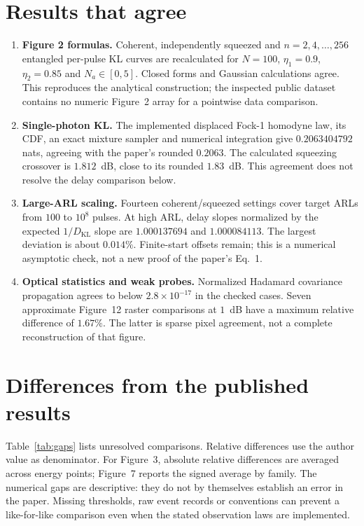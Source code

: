 \documentclass[11pt,a4paper]{article}
\newcommand{\KL}{D_{\mathrm{KL}}}
\begin{document}
\section{Results that agree}
\begin{enumerate}
\item \textbf{Figure 2 formulas.} Coherent, independently squeezed and
$n=2,4,\ldots,256$ entangled per-pulse KL curves are recalculated for
$N=100$, $\eta_1=0.9$, $\eta_2=0.85$ and $N_a\in[0,5]$.
Closed forms and Gaussian calculations agree. This reproduces the analytical
construction; the inspected public dataset contains no numeric Figure~2 array for a
pointwise data comparison.
\item \textbf{Single-photon KL.} The implemented displaced Fock-1 homodyne law,
its CDF, an exact mixture sampler and numerical integration give
$0.2063404792$ nats, agreeing with the paper's rounded $0.2063$.
The calculated squeezing crossover is $1.812$~dB, close to its rounded
$1.83$~dB. This agreement does not resolve the delay comparison below.
\item \textbf{Large-ARL scaling.} Fourteen coherent/squeezed settings cover
target ARLs from $100$ to $10^8$ pulses. At high ARL, delay slopes normalized
by the expected $1/\KL$ slope are $1.000137694$ and $1.000084113$.
The largest deviation is about $0.014\%$. Finite-start offsets remain;
this is a numerical asymptotic check, not a new proof of the paper's Eq.~1.
\item \textbf{Optical statistics and weak probes.} Normalized Hadamard covariance
propagation agrees to below $2.8\times10^{-17}$ in the checked cases.
Seven approximate Figure~12 raster comparisons at $1$~dB have a maximum
relative difference of $1.67\%$. The latter is sparse pixel agreement, not
a complete reconstruction of that figure.
\end{enumerate}

\section{Differences from the published results}
Table~\ref{tab:gaps} lists unresolved comparisons. Relative differences use the author value as denominator. For Figure~3, absolute relative differences are averaged across energy points; Figure~7 reports the signed average by family. The numerical gaps are
descriptive: they do not by themselves establish an error in the paper.
Missing thresholds, raw event records or conventions can prevent a like-for-like
comparison even when the stated observation laws are implemented.
\end{document}
